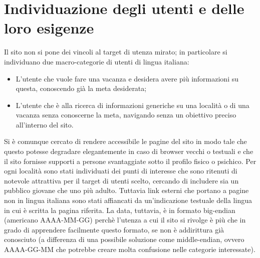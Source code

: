 \section{Individuazione degli utenti e delle loro esigenze}\label{sec:requisiti}
Il sito non si pone dei vincoli al target di utenza mirato; in particolare si individuano due macro-categorie di utenti di lingua italiana:
\begin{itemize}
\item L'utente che vuole fare una vacanza e desidera avere più informazioni su
questa, conoscendo già la meta desiderata;
\item L'utente che è alla ricerca di informazioni generiche su una località o
di una vacanza senza conoscerne la meta, navigando senza un obiettivo preciso
all'interno del sito.
\end{itemize}
Si è comunque cercato di rendere accessibile le pagine del sito in modo tale
che questo potesse degradare elegantemente in caso di browser vecchi o testuali
e che il sito fornisse supporti a persone svantaggiate sotto il profilo fisico
o psichico.
Per ogni località sono stati individuati dei punti di interesse che sono
ritenuti di notevole attrattiva per il target di utenti scelto, cercando di
includere sia un pubblico giovane che uno più adulto. Tuttavia link esterni che
portano a pagine non in lingua italiana sono stati affiancati da un'indicazione
testuale della lingua in cui è scritta la pagina riferita.
La data, tuttavia, è in formato big-endian (americano AAAA-MM-GG) perchè
l'utenza a cui il sito si rivolge è più che in grado di apprendere facilmente
questo formato, se non è addirittura già conosciuto (a differenza di una
possibile soluzione come middle-endian, ovvero AAAA-GG-MM che potrebbe creare
molta confusione nelle categorie interessate).
